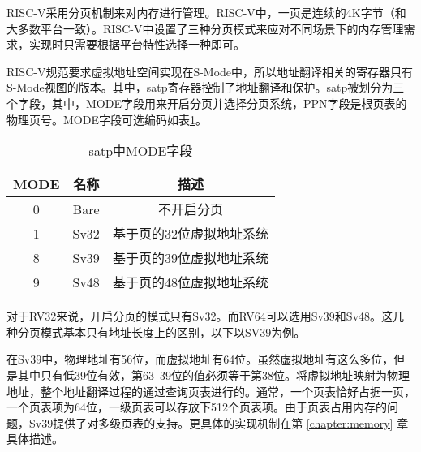 RISC-V采用分页机制来对内存进行管理。RISC-V中，一页是连续的4K字节（和大多数平台一致）。RISC-V中设置了三种分页模式来应对不同场景下的内存管理需求，实现时只需要根据平台特性选择一种即可。

RISC-V规范要求虚拟地址空间实现在S-Mode中，所以地址翻译相关的寄存器只有S-Mode视图的版本。其中，satp寄存器控制了地址翻译和保护。satp被划分为三个字段，其中，MODE字段用来开启分页并选择分页系统，PPN字段是根页表的物理页号。MODE字段可选编码如表\ref{tab:satpmode}。

\begin{table}[h]
	\centering
	\setlength{\belowcaptionskip}{2pt}
	\caption{satp中MODE字段}
	\label{tab:satpmode}
	\begin{tabular}{|c|c|c|}
		\hline
		MODE             & 名称       & 描述                                        \\ \hline
		0                & Bare       & 不开启分页                                   \\ \hline
		1                & Sv32       & 基于页的32位虚拟地址系统                      \\ \hline
		8                & Sv39       &          基于页的39位虚拟地址系统                      \\ \hline
		9                & Sv48       & 基于页的48位虚拟地址系统                      \\ \hline
	\end{tabular}
\end{table}

对于RV32来说，开启分页的模式只有Sv32。而RV64可以选用Sv39和Sv48。这几种分页模式基本只有地址长度上的区别，以下以SV39为例。

在Sv39中，物理地址有56位，而虚拟地址有64位。虽然虚拟地址有这么多位，但是其中只有低39位有效，第63~39位的值必须等于第38位。将虚拟地址映射为物理地址，整个地址翻译过程的通过查询页表进行的。通常，一个页表恰好占据一页，一个页表项为64位，一级页表可以存放下512个页表项。由于页表占用内存的问题，Sv39提供了对多级页表的支持。更具体的实现机制在第 \ref{chapter:memory} 章具体描述。